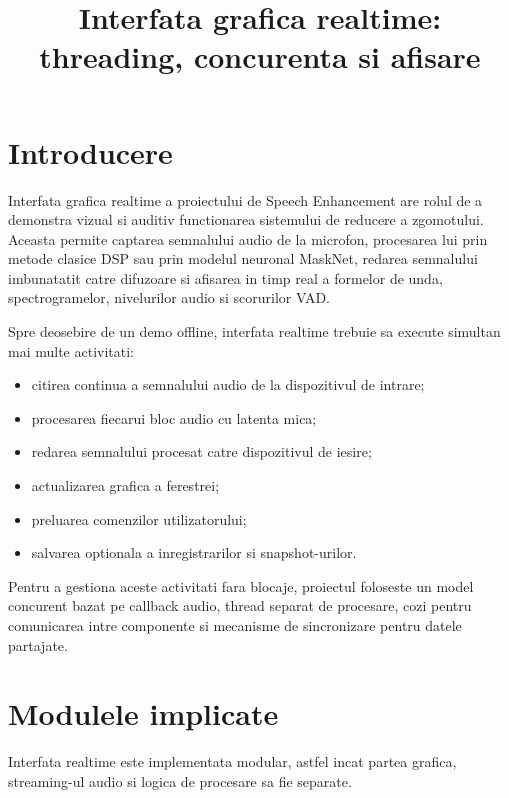 \documentclass[12pt,a4paper]{article}
\title{Interfata grafica realtime: threading, concurenta si afisare}
\author{}
\date{}
\begin{document}
\maketitle
\tableofcontents
\newpage

\section{Introducere}

Interfata grafica realtime a proiectului de Speech Enhancement are rolul de a
demonstra vizual si auditiv functionarea sistemului de reducere a zgomotului.
Aceasta permite captarea semnalului audio de la microfon, procesarea lui prin
metode clasice DSP sau prin modelul neuronal MaskNet, redarea semnalului
imbunatatit catre difuzoare si afisarea in timp real a formelor de unda,
spectrogramelor, nivelurilor audio si scorurilor VAD.

Spre deosebire de un demo offline, interfata realtime trebuie sa execute simultan
mai multe activitati:

\begin{itemize}
    \item citirea continua a semnalului audio de la dispozitivul de intrare;
    \item procesarea fiecarui bloc audio cu latenta mica;
    \item redarea semnalului procesat catre dispozitivul de iesire;
    \item actualizarea grafica a ferestrei;
    \item preluarea comenzilor utilizatorului;
    \item salvarea optionala a inregistrarilor si snapshot-urilor.
\end{itemize}

Pentru a gestiona aceste activitati fara blocaje, proiectul foloseste un model
concurent bazat pe callback audio, thread separat de procesare, cozi pentru
comunicarea intre componente si mecanisme de sincronizare pentru datele partajate.

\section{Modulele implicate}

Interfata realtime este implementata modular, astfel incat partea grafica,
streaming-ul audio si logica de procesare sa fie separate.
\end{document}
